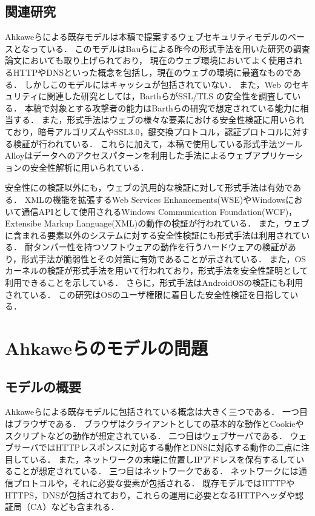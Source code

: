\documentclass{css}
\begin{document}
\subsection{関連研究}
Ahkaweらによる既存モデル\cite{webmodel}は本稿で提案するウェブセキュリティモデルのベースとなっている．
このモデルはBauらによる昨今の形式手法を用いた研究の調査論文\cite{security_modeling_and_analysis}においても取り上げられており，
現在のウェブ環境においてよく使用されるHTTPやDNSといった概念を包括し，現在のウェブの環境に最適なものである．
しかしこのモデルにはキャッシュが包括されていない．
また，Web のセキュリティに関連した研究としては，Barthら\cite{securing_frame_communication_in_browsers}がSSL/TLS の安全性を調査している．
本稿で対象とする攻撃者の能力はBarthらの研究で想定されている能力に相当する．
また，形式手法はウェブの様々な要素における安全性検証に用いられており，暗号アルゴリズムやSSL3.0，鍵交換プロトコル，認証プロトコルに対する検証が行われている\cite{TFFWS17,TFFWS18,TFFWS19,TFFWS20}．
これらに加えて，本稿で使用している形式手法ツールAlloyはデータへのアクセスパターンを利用した手法によるウェブアプリケーションの安全性解析に用いられている\cite{finding_security_bugs_in_web}．

安全性にの検証以外にも，ウェブの汎用的な検証に対して形式手法は有効である．
XMLの機能を拡張するWeb Services Enhancements(WSE)やWindowsにおいて通信APIとして使用されるWindows Communication Foundation(WCF)，Extensibe Markup Language(XML)の動作の検証\cite{TFFWS27,TFFWS28}が行われている．
また，ウェブに含まれる要素以外のシステムに対する安全性検証にも形式手法は利用されている．
耐タンパー性を持つソフトウェアの動作を行うハードウェアの検証\cite{specifying_and_verifying_hardware_for}があり，形式手法が脆弱性とその対策に有効であることが示されている．
また，OSカーネルの検証\cite{sel4_formal_verification_of_an}が形式手法を用いて行われており，形式手法を安全性証明として利用できることを示している．
さらに，形式手法はAndroidOSの検証\cite{towards_formal_analysis_of_the}にも利用されている．
この研究はOSのユーザ権限に着目した安全性検証を目指している．

\section{Ahkaweらのモデルの問題}

\subsection{モデルの概要}
\label{sec:existingmodel}
Ahkaweらによる既存モデル\cite{webmodel}に包括されている概念は大きく三つである．
一つ目はブラウザである．
ブラウザはクライアントとしての基本的な動作とCookieやスクリプトなどの動作が想定されている．
二つ目はウェブサーバである．
ウェブサーバではHTTPレスポンスに対応する動作とDNSに対応する動作の二点に注目している．
また，ネットワークの末端に位置しIPアドレスを保有するしていることが想定されている．
三つ目はネットワークである．
ネットワークには通信プロトコルや，それに必要な要素が包括される．
既存モデルではHTTPやHTTPS，DNSが包括されており，これらの運用に必要となるHTTPヘッダや認証局（CA）なども含まれる．
\end{document}

